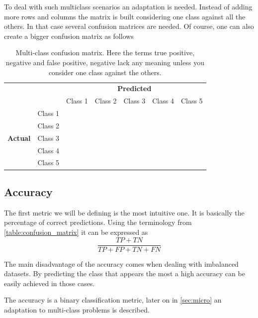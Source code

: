 To deal with such multiclass scenarios an adaptation is needed. Instead of adding more rows and columns the matrix is built considering one class against all the others. In that case several confusion matrices are needed. Of course, one can also create a bigger confusion matrix as follows

\begin{table}[ht]
\centering
\caption{Multi-class confusion matrix. Here the terms true positive, negative and false positive, negative lack any meaning unless you consider one class against the others.}
\label{table:confusion_matrix2}
\begin{tabular}{c c c|c|c|c|c|}
& & \multicolumn{5}{c}{\textbf{Predicted}} \\ \cline{3-7}
& & \multicolumn{1}{|c|}{Class 1} & Class 2 & Class 3 & Class 4 & Class 5 \\ \cline{2-7}
\multirow{5}{*}{\textbf{Actual}} & \multicolumn{1}{|c|}{Class 1} & & & & & \\ \cline{2-7}
                     & \multicolumn{1}{|c|}{Class 2} & & & & & \\ \cline{2-7}
                     & \multicolumn{1}{|c|}{Class 3} & & & & & \\ \cline{2-7}
                     & \multicolumn{1}{|c|}{Class 4} & & & & & \\ \cline{2-7}
                     & \multicolumn{1}{|c|}{Class 5} & & & & & \\ \cline{2-7}
\end{tabular}
\end{table}

\subsection{Accuracy}\label{sec:acc}

The first metric we will be defining is the most intuitive one. It is basically the percentage of correct predictions. Using the terminology from \autoref{table:confusion_matrix} it can be expressed as 
\begin{equation}
    \frac{TP + TN}{TP + FP + TN + FN}
\end{equation}

The main disadvantage of the accuracy comes when dealing with imbalanced datasets. By predicting the class that appears the most a high accuracy can be easily achieved in those cases.

The accuracy is a binary classification metric, later on in \autoref{sec:micro} an adaptation to multi-class problems is described.


